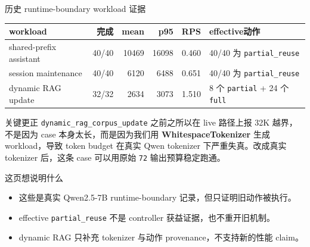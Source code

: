 \documentclass[aspectratio=169,UTF8,11pt]{ctexbeamer}
\begin{document}
\begin{frame}{历史 runtime-boundary workload 证据}
  \scriptsize
  \begin{tabular}{p{}rrrrp{}}
    \toprule
    workload & 完成 & mean & p95 & RPS & effective动作 \\
    \midrule
    shared-prefix assistant & 40/40 & 10469 & 16098 & 0.460 & 40/40 为 \texttt{partial\_reuse} \\
    session maintenance & 40/40 & 6120 & 6488 & 0.651 & 40/40 为 \texttt{partial\_reuse} \\
    dynamic RAG update & 32/32 & 2634 & 3073 & 1.510 & 8 个 \texttt{partial} + 24 个 \texttt{full} \\
    \bottomrule
  \end{tabular}

  \vspace{0.5em}
  \begin{alertblock}{关键更正}
    \texttt{dynamic\_rag\_corpus\_update} 之前之所以在 live 路径上报 32K 越界，不是因为 case 本身太长，而是因为我们用 \textbf{WhitespaceTokenizer} 生成 workload，导致 token budget 在真实 Qwen tokenizer 下严重失真。改成真实 tokenizer 后，这条 case 可以用原始 \texttt{72} 输出预算稳定跑通。
  \end{alertblock}

  \vspace{0.2em}
  \begin{block}{这页想说明什么}
    \begin{itemize}
      \item 这些是真实 Qwen2.5-7B runtime-boundary 记录，但只证明旧动作被执行。
      \item effective \texttt{partial\_reuse} 不是 controller 获益证据，也不重开旧机制。
      \item dynamic RAG 只补充 tokenizer 与动作 provenance，不支持新的性能 claim。
    \end{itemize}
  \end{block}
\end{frame}
\end{document}
